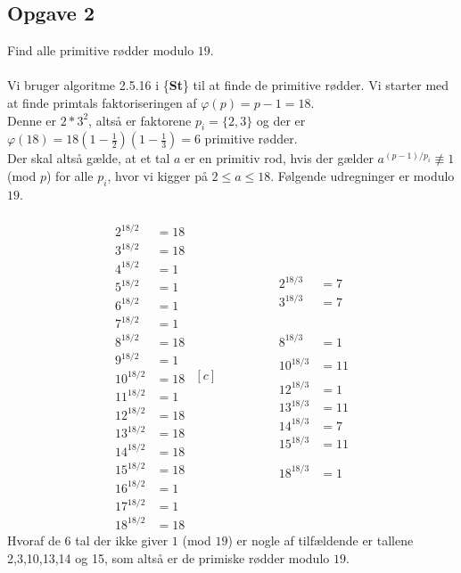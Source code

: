 \documentclass[12pt]{article}
\begin{document}
\subsection*{Opgave 2}
Find alle primitive rødder modulo $19$.\\
\\
Vi bruger algoritme 2.5.16 i \{\textbf{St}\} til at finde de primitive rødder. Vi starter med at finde primtals faktoriseringen af $\varphi(p)=p-1=18$. \\
Denne er $2*3^2$, altså er faktorene $p_i=\{2,3\}$ og der er $\varphi(18)=18(1-\frac{1}{2})(1-\frac{1}{3})=6$ primitive rødder.\\
Der skal altså gælde, at et tal $a$ er en primitiv rod, hvis der gælder $a^{(p-1)/p_i} \not\equiv 1$ (mod $p$) for alle $p_i$, hvor vi kigger på $2\leq a\leq 18$. Følgende udregninger er modulo $19$.\\
\\
\begin{equation*}
\begin{aligned}
2^{18/2}&=18 \\
3^{18/2}&=18 \\
4^{18/2}&=1 \\
5^{18/2}&=1 \\
6^{18/2}&=1 \\
7^{18/2}&=1 \\
8^{18/2}&=18 \\
9^{18/2}&=1 \\
10^{18/2}&=18 \\
11^{18/2}&=1 \\
12^{18/2}&=18 \\
13^{18/2}&=18 \\
14^{18/2}&=18 \\
15^{18/2}&=18 \\
16^{18/2}&=1 \\
17^{18/2}&=1 \\
18^{18/2}&=18
\end{aligned}
\begin{aligned}[c]
\;\;\;\;\;\;\;\;\;\;\;\;\;\;\;
\end{aligned}
\begin{aligned}
2^{18/3}&=7 \\ 
3^{18/3}&=7 \\
\\
\\
\\
\\
8^{18/3}&=1 \\
\\
10^{18/3}&=11 \\
\\
12^{18/3}&=1 \\
13^{18/3}&=11 \\
14^{18/3}&=7 \\
15^{18/3}&=11 \\
\\
\\
18^{18/3}&=1
\end{aligned}
\end{equation*}
Hvoraf de $6$ tal der ikke giver $1$ (mod $19$) er nogle af tilfældende er tallene 2,3,10,13,14 og 15, som altså er de primiske rødder modulo $19$.
\end{document}

